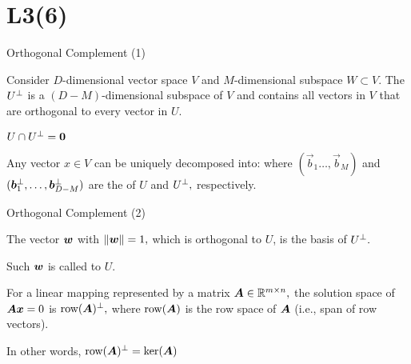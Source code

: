 \documentclass[handout,fleqn,aspectratio=169]{beamer}
\begin{document}
\section{L3(6)}
\begin{frame}{Orthogonal Complement (1)}

\plitemsep 0.1in

\bci 

\item Consider $D$-dimensional vector space $V$ and $M$-dimensional subspace  $W \subset V.$ The  $U^{\bot}$ is a $(D-M)$-dimensional subspace of $V$ and contains all vectors in $V$ that are orthogonal to every vector in $U.$

\item $U \cap U^{\bot} = \bm{0}$

\item Any vector $x \in V$ can be uniquely decomposed into:
where $(\vec{b}_1 \ldots, \vec{b}_M)$ and $(\bm{b}^{\bot}_1, \ldots, \bm{b}^{\bot}_{D-M} )$ are the  of $U$ and $U^{\bot},$ respectively. 
\eci
\end{frame}

\begin{frame}{Orthogonal Complement (2)}

\plitemsep 0.1in

\vspace{-0.3cm}
\begin{center}
\end{center}
\vspace{-0.5cm}
\bci 
\item The vector $\bm{w}$ with $\left \lVert \bm{w} \right \rVert=1,$ which is orthogonal to $U$, is the basis of $U^{\bot}.$
\item Such $\bm{w}$ is called  to $U.$

\item For a linear mapping represented by a matrix $\bm{A} \in {\mathbb R}^{m \times n},$ the solution space of $\bm{A} \bm{x} =0$ is $\text{row}(\bm{A})^{\bot},$ where $\text{row}(\bm{A})$ is the row space of $\bm{A}$ (i.e., span of row vectors).

In other words, $\text{row}(\bm{A})^{\bot} = \ker(\bm{A})$
\eci


\end{frame}
\end{document}
